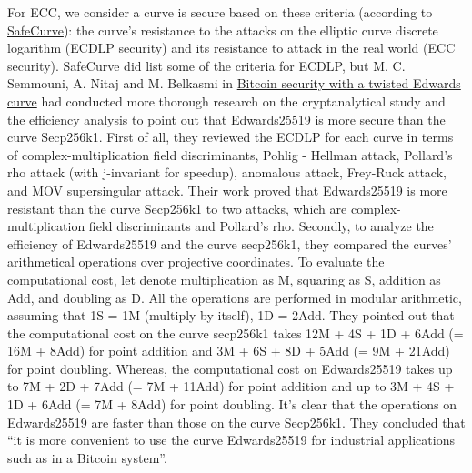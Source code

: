For ECC, we consider a curve is secure based on these criteria (according to \href{http://safecurves.cr.yp.to/index.html}{SafeCurve}): the curve’s resistance to the attacks on the elliptic curve discrete logarithm (ECDLP security) and its resistance to attack in the real world (ECC security). SafeCurve did list some of the criteria for ECDLP, but M. C. Semmouni, A. Nitaj and M. Belkasmi in \href{https://sci-hub.se/10.1080/09720529.2019.1681673}{Bitcoin security with a twisted Edwards curve} had conducted more thorough research on the cryptanalytical study and the efficiency analysis to point out that Edwards25519 is more secure than the curve Secp256k1. First of all, they reviewed the ECDLP for each curve in terms of complex-multiplication field discriminants, Pohlig - Hellman attack, Pollard’s rho attack (with j-invariant for speedup), anomalous attack, Frey-Ruck attack, and MOV supersingular attack. Their work proved that Edwards25519 is more resistant than the curve Secp256k1 to two attacks, which are complex-multiplication field discriminants and Pollard’s rho. Secondly, to analyze the efficiency of Edwards25519 and the curve secp256k1, they compared the curves’ arithmetical operations over projective coordinates. To evaluate the computational cost, let denote multiplication as M, squaring as S, addition as Add, and doubling as D. All the operations are performed in modular arithmetic, assuming that 1S = 1M (multiply by itself), 1D = 2Add. They pointed out that the computational cost on the curve secp256k1 takes 12M + 4S + 1D + 6Add (= 16M + 8Add) for point addition and 3M + 6S + 8D + 5Add (= 9M + 21Add) for point doubling. Whereas, the computational cost on Edwards25519 takes up to 7M + 2D + 7Add (= 7M + 11Add) for point addition and up to 3M + 4S + 1D + 6Add (= 7M + 8Add) for point doubling. It’s clear that the operations on Edwards25519 are faster than those on the curve Secp256k1. They concluded that “it is more convenient to use the curve Edwards25519 for industrial applications such as in a Bitcoin system”.

